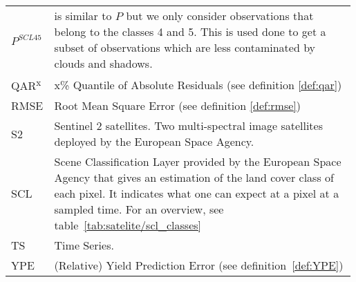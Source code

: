 \begin{longtable}{p{0.12\linewidth} p{0.87\linewidth}}
	$P^{SCL45}$       & is similar to $P$ but we only consider observations that belong to the classes 4 and 5. This is used done to get a subset of observations which are less contaminated by clouds and shadows.\\
	QAR\textsuperscript{x}       & x\% Quantile of Absolute Residuals  (see definition \ref{def:qar})\\
	RMSE         & Root Mean Square Error (see definition \ref{def:rmse})\\
	S2       & Sentinel 2 satellites. Two multi-spectral image satellites deployed by the European Space Agency. \\
	SCL       & Scene Classification Layer provided by the European Space Agency that gives an estimation of the land cover class of each pixel. It indicates what one can expect at a pixel at a sampled time. For an overview, see table~\ref{tab:satelite/scl_classes}\\
	TS       & Time Series. \\
	YPE        & (Relative) Yield Prediction Error (see definition~\ref{def:YPE})\\
\end{longtable} 

